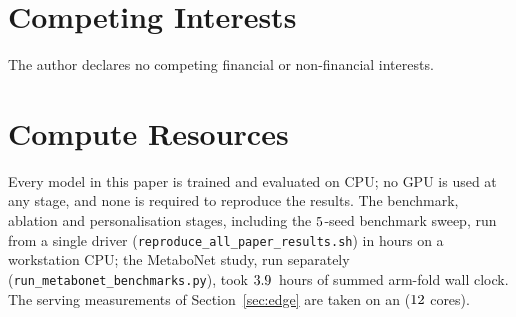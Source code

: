 \documentclass[pmlr,twocolumn,10pt]{jmlr}
\begin{document}
\section*{Competing Interests}
The author declares no competing financial or non-financial interests.

\section*{Compute Resources}
Every model in this paper is trained and evaluated on CPU; no GPU is used at any
stage, and none is required to reproduce the results. The benchmark, ablation
and personalisation stages, including the $5$-seed benchmark sweep,
run from a single driver (\texttt{reproduce\_all\_paper\_results.sh}) in hours on
a workstation CPU; the MetaboNet study, run separately
(\texttt{run\_metabonet\_benchmarks.py}), took $3.9$~hours of
summed arm-fold wall clock. The serving measurements of
Section~\ref{sec:edge} are taken on an \NumEdgeCPU{} ($12$ cores).



\clearpage
\appendix






\end{document}
